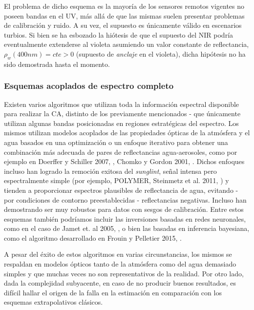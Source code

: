             El problema de dicho esquema es la mayoría de los sensores remotos vigentes no poseen bandas en el UV, más allá de que las mismas suelen presentar problemas de calibración y ruido. A su vez, el supuesto es únicamente válido en escenarios turbios. Si bien se ha esbozado la hiótesis de que el supuesto del NIR podría eventualmente extenderse al violeta asumiendo un valor constante de reflectancia, $\rho_{w}(400 nm)=cte>0$ (supuesto de \textit{anclaje} en el violeta), dicha hipótesis no ha sido demostrada hasta el momento.

        \subsubsection{Esquemas acoplados de espectro completo}
        \label{int:s:ACacoplados}
            Existen varios algoritmos que utilizan toda la información espectral disponible para realizar la CA, distinto de los previamente mencionados - que únicamente utilizan algunas bandas posicionadas en regiones estratégicas del espectro. Los mismos utilizan modelos acoplados de las propiedades ópticas de la atmósfera y el agua basados en una optimización o un enfoque iterativo para obtener una combinación más adecuada de pares de reflectancias agua-aerosoles, como por ejemplo en Doerffer y Schiller 2007, \cite{doerffer2007}, Chomko y Gordon 2001, \cite{chomko2001}. Dichos enfoques incluso han logrado la remoción exitosa del \textit{sunglint}, señal intensa pero espectralmente simple (por ejemplo, POLYMER, Steinmetz et al. 2011, \cite{steinmetz2011}) y tienden a proporcionar espectros plausibles de reflectancia de agua, evitando - por condiciones de contorno preestablecidas - reflectancias negativas. Incluso han demostrando ser muy robustos para datos con sesgos de calibración. Entre estos esquemas también podríamos incluir las inversiones basadas en redes neuronales, como en el caso de Jamet et. al 2005, \cite{jamet2005}, o bien las basadas en inferencia bayesiana, como el algoritmo desarrollado en Frouin y Pelletier 2015, \cite{frouin2015}.
            
            A pesar del éxito de estos algoritmos en varias circunstancias, los mismos se respaldan en modelos ópticos tanto de la atmósfera como del agua demasiado simples y que muchas veces no son representativos de la realidad. Por otro lado, dada la complejidad subyacente, en caso de no producir buenos resultados, es difícil hallar el origen de la falla en la estimación en comparación con los esquemas extrapolativos clásicos.

